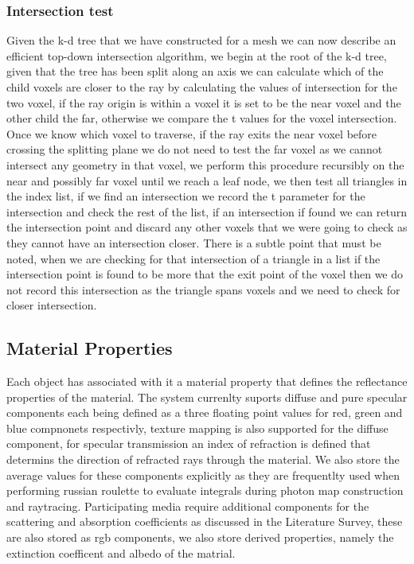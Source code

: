 \subsubsection{Intersection test}
Given the k-d tree that we have constructed for a mesh we can now describe an efficient top-down intersection algorithm,
we begin at the root of the k-d tree, given that the tree has been split along an axis we can calculate which of the
child voxels are closer to the ray by calculating the values of intersection for the two voxel, if the ray origin is
within a voxel it is set to be the near voxel and the other child the far, otherwise we compare the t values for the
voxel intersection. Once we know which voxel to traverse, if the ray exits the near voxel before crossing the splitting
plane we do not need to test the far voxel as we cannot intersect any geometry in that voxel, we perform this procedure
recursibly on the near and possibly far voxel until we reach a leaf node, we then test all triangles in the index list,
if we find an intersection we record the t parameter for the intersection and check the rest of the list, if an intersection
if found we can return the intersection point and discard any other voxels that we were going to check as they cannot
have an intersection closer. There is a subtle point that must be noted, when we are checking for that intersection of
a triangle in a list if the intersection point is found to be more that the exit point of the voxel then we do not
record this intersection as the triangle spans voxels and we need to check for closer intersection.



\subsection{Material Properties}
Each object has associated with it a material property that defines the reflectance properties of the material.
The system currenlty suports diffuse and pure specular components each being defined as a three floating point
values for red, green and blue compnonets respectivly, texture mapping is also supported for the diffuse component,
for specular transmission an index of refraction is defined that determins the direction of refracted rays through the
material. We also store the average values for these components explicitly as they are frequentlty used when performing
russian roulette to evaluate integrals during photon map construction and raytracing. Participating media require additional
components for the scattering and absorption coefficients as discussed in the Literature Survey, these are also stored
as rgb components, we also store derived properties, namely the extinction coefficent and albedo of the matrial.
